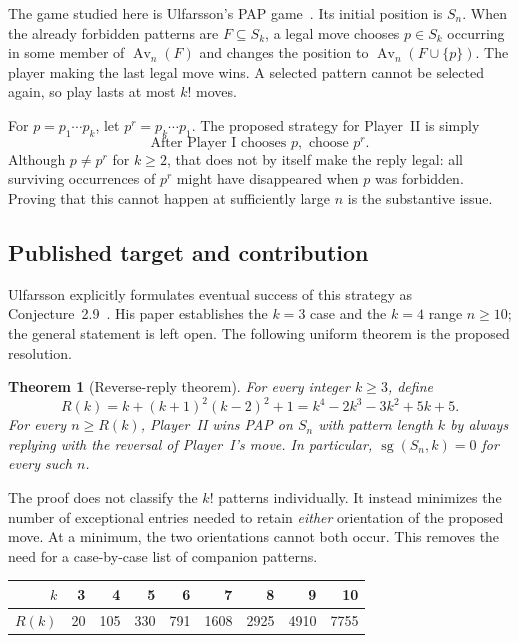 \documentclass[11pt,a4paper]{article}
\newtheorem{theorem}{Theorem}[section]
\theoremstyle{definition}
\theoremstyle{remark}
\DeclareMathOperator{\Av}{Av}
\DeclareMathOperator{\sg}{sg}
\newcommand{\replybound}{R(k)}
\begin{document}
The game studied here is Ulfarsson's PAP game~\cite{Ulfarsson}. Its initial
position is $S_n$. When the already forbidden patterns are $F\subseteq S_k$,
a legal move chooses $p\in S_k$ occurring in some member of $\Av_n(F)$ and
changes the position to $\Av_n(F\cup\{p\})$. The player making the last legal
move wins. A selected pattern cannot be selected again, so play lasts at
most $k!$ moves.

For $p=p_1\cdots p_k$, let $p^r=p_k\cdots p_1$. The proposed strategy for
Player~II is simply
\[
 \boxed{\text{After Player I chooses }p,\text{ choose }p^r.}
\]
Although $p\ne p^r$ for $k\ge2$, that does not by itself make the reply legal:
all surviving occurrences of $p^r$ might have disappeared when $p$ was
forbidden. Proving that this cannot happen at sufficiently large $n$ is the
substantive issue.

\subsection{Published target and contribution}
Ulfarsson explicitly formulates eventual success of this strategy as
Conjecture~2.9~\cite{Ulfarsson}. His paper establishes the $k=3$ case and the
$k=4$ range $n\ge10$; the general statement is left open. The following
uniform theorem is the proposed resolution.

\begin{theorem}[Reverse-reply theorem]\label{thm:main}
For every integer $k\ge3$, define
\begin{equation}\label{eq:bound}
 \replybound=k+(k+1)^2(k-2)^2+1
 =k^4-2k^3-3k^2+5k+5.
\end{equation}
For every $n\ge\replybound$, Player~II wins PAP on $S_n$ with pattern length
$k$ by always replying with the reversal of Player~I's move. In particular,
$\sg(S_n,k)=0$ for every such $n$.
\end{theorem}

The proof does not classify the $k!$ patterns individually. It instead
minimizes the number of exceptional entries needed to retain \emph{either}
orientation of the proposed move. At a minimum, the two orientations cannot
both occur. This removes the need for a case-by-case list of companion
patterns.

\begin{center}
\begin{tabular}{@{}rrrrrrrrr@{}}
\toprule
$k$ &3&4&5&6&7&8&9&10\\
\midrule
$\replybound$ &20&105&330&791&1608&2925&4910&7755\\
\bottomrule
\end{tabular}
\end{center}
\end{document}
